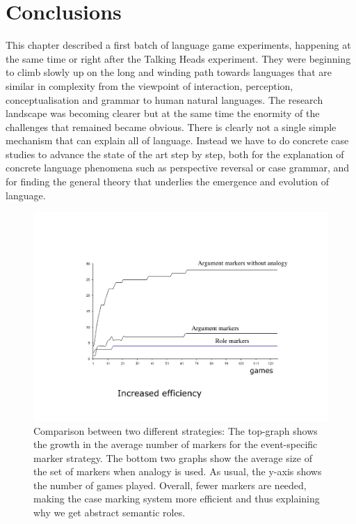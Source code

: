 \section{Conclusions} 

This chapter described a first batch of language game experiments, happening at the same time or right after the Talking Heads 
experiment. They were beginning to climb slowly up on the long and winding path towards languages that are similar in 
complexity from the viewpoint of interaction, perception, conceptualisation and grammar to human natural languages. 
The research landscape was becoming clearer but at the same time the enormity of the challenges that remained
became obvious. There is clearly not a single simple mechanism that can explain all of language. Instead we have 
to do concrete case studies to advance the state of the art step by step, both for the explanation of concrete language 
phenomena such as perspective reversal or case grammar, and for finding the general theory that underlies the 
emergence and evolution of language. 


\begin{figure}[h]
  \centerline{\includegraphics[width=.9\textwidth]{chap10/figs/comparison.pdf}}
\caption{\label{fig:comparison}Comparison between two different strategies: The top-graph shows the growth in the average number of 
markers for the event-specific marker strategy. 
The bottom two graphs show the average size of the set of markers when analogy is used. As usual, the y-axis shows 
the number of games played. Overall, fewer markers are needed, making the case marking system more efficient 
and thus explaining why we get abstract semantic roles.}
\end{figure}

